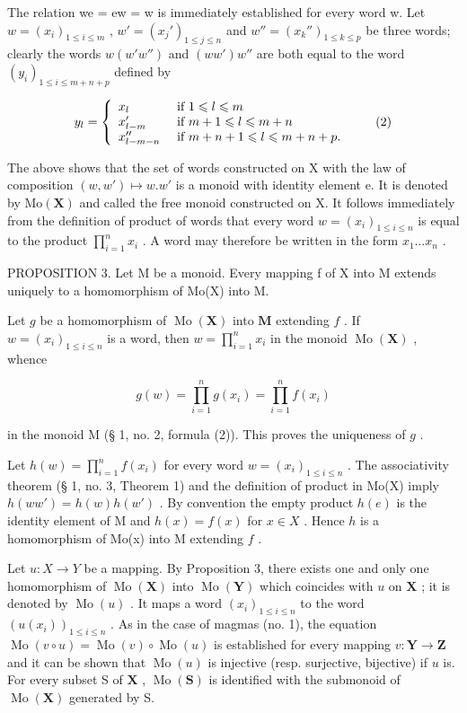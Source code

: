 The relation we = ew = w is immediately established for every word w. Let \(w = (x_{i})_{1 \leqslant i \leqslant m}\) , \(w' = (x_{j}')_{1 \leqslant j \leqslant n}\) and \(w'' = (x_{k}'')_{1 \leqslant k \leqslant p}\) be three words; clearly the words \(w(w'w'')\) and \((ww')w''\) are both equal to the word \((y_{i})_{1 \leqslant i \leqslant m+n+p}\) defined by

\[
y _ {l} = \left\{ \begin{array}{l l} x _ {l} & \text { if } 1 \leqslant l \leqslant m \\ x _ {l - m} ^ {\prime} & \text { if } m + 1 \leqslant l \leqslant m + n \\ x _ {l - m - n} ^ {\prime \prime} & \text { if } m + n + 1 \leqslant l \leqslant m + n + p. \end{array} \right.\tag{2}
\]

The above shows that the set of words constructed on X with the law of composition \((w, w') \mapsto w.w'\) is a monoid with identity element e. It is denoted by \(\mathrm{Mo}(\mathbf{X})\) and called the free monoid constructed on X. It follows immediately from the definition of product of words that every word \(w = (x_i)_{1 \leq i \leq n}\) is equal to the product \(\prod_{i=1}^{n} x_i\) . A word may therefore be written in the form \(x_1 \ldots x_{n}\) .

PROPOSITION 3. Let M be a monoid. Every mapping f of X into M extends uniquely to a homomorphism of Mo(X) into M.

Let \(g\) be a homomorphism of \(\operatorname{Mo}(\mathbf{X})\) into \(\mathbf{M}\) extending \(f\) . If \(w = (x_{i})_{1 \leqslant i \leqslant n}\) is a word, then \(w = \prod_{i=1}^{n} x_{i}\) in the monoid \(\operatorname{Mo}(\mathbf{X})\) , whence

\[
g (w) = \prod_ {i = 1} ^ {n} g (x _ {i}) = \prod_ {i = 1} ^ {n} f (x _ {i})
\]

in the monoid M (§ 1, no. 2, formula (2)). This proves the uniqueness of \(g\) .

Let \(h(w) = \prod_{i=1}^{n} f(x_i)\) for every word \(w = (x_i)_{1 \leqslant i \leqslant n}\) . The associativity theorem (§ 1, no. 3, Theorem 1) and the definition of product in Mo(X) imply \(h(ww') = h(w)h(w')\) . By convention the empty product \(h(e)\) is the identity element of M and \(h(x) = f(x)\) for \(x \in X\) . Hence \(h\) is a homomorphism of Mo(x) into M extending \(f\) .

Let \(u: X \to Y\) be a mapping. By Proposition 3, there exists one and only one homomorphism of \(\operatorname{Mo}(\mathbf{X})\) into \(\operatorname{Mo}(\mathbf{Y})\) which coincides with \(u\) on \(\mathbf{X}\) ; it is denoted by \(\operatorname{Mo}(u)\) . It maps a word \((x_i)_{1 \leqslant i \leqslant n}\) to the word \((u(x_i))_{1 \leqslant i \leqslant n}\) . As in the case of magmas (no. 1), the equation \(\operatorname{Mo}(v \circ u) = \operatorname{Mo}(v) \circ \operatorname{Mo}(u)\) is established for every mapping \(v: \mathbf{Y} \to \mathbf{Z}\) and it can be shown that \(\operatorname{Mo}(u)\) is injective (resp. surjective, bijective) if \(u\) is. For every subset S of \(\mathbf{X}\) , \(\operatorname{Mo}(\mathbf{S})\) is identified with the submonoid of \(\operatorname{Mo}(\mathbf{X})\) generated by S.

